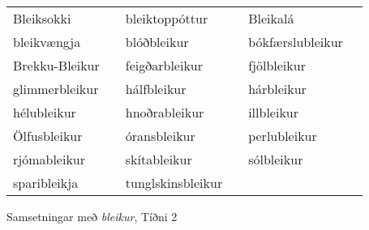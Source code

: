 \documentclass[../samsetningasafn.tex]{subfiles}
\begin{document}
\begin{wordlist}[H]
\begin{tcolorbox}
\begin{tabular}{BlBlBl}
		Bleiksokki	&		& 		
		bleiktoppóttur & 		& 	
		Bleikalá		&		\\ 		
		bleikvængja	&		& 	
		blóðbleikur	&		& 		
		bókfærslubleikur &	\\ 		
		Brekku-Bleikur &		& 		
		feigðarbleikur	&	& 	
		fjölbleikur	&		\\ 		
		glimmerbleikur &		& 		
		hálfbleikur	&		& 		
		hárbleikur	&		\\ 		
		hélubleikur	&		& 	
		hnoðrableikur	&	& 		
		illbleikur		&		\\ 		
		Ölfusbleikur	&		& 	
		óransbleikur	&		& 		
		perlubleikur	&		\\ 		
		rjómableikur	&		& 	
		skítableikur	&		& 	
		sólbleikur	&		\\ 	
		sparibleikja	&		& 		
		tunglskinsbleikur &	& 	
					&
\end{tabular}

\end{tcolorbox}
	\caption{Samsetningar með \textit{bleikur}, Tíðni 2}
	\label{listi:bleikt.2}
\end{wordlist}
\end{document}
